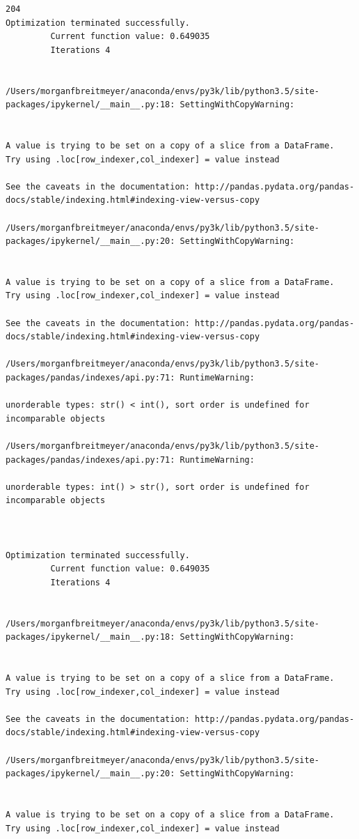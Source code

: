 \begin{lstlisting}
204
Optimization terminated successfully.
         Current function value: 0.649035
         Iterations 4


/Users/morganfbreitmeyer/anaconda/envs/py3k/lib/python3.5/site-packages/ipykernel/__main__.py:18: SettingWithCopyWarning:


A value is trying to be set on a copy of a slice from a DataFrame.
Try using .loc[row_indexer,col_indexer] = value instead

See the caveats in the documentation: http://pandas.pydata.org/pandas-docs/stable/indexing.html#indexing-view-versus-copy

/Users/morganfbreitmeyer/anaconda/envs/py3k/lib/python3.5/site-packages/ipykernel/__main__.py:20: SettingWithCopyWarning:


A value is trying to be set on a copy of a slice from a DataFrame.
Try using .loc[row_indexer,col_indexer] = value instead

See the caveats in the documentation: http://pandas.pydata.org/pandas-docs/stable/indexing.html#indexing-view-versus-copy

/Users/morganfbreitmeyer/anaconda/envs/py3k/lib/python3.5/site-packages/pandas/indexes/api.py:71: RuntimeWarning:

unorderable types: str() < int(), sort order is undefined for incomparable objects

/Users/morganfbreitmeyer/anaconda/envs/py3k/lib/python3.5/site-packages/pandas/indexes/api.py:71: RuntimeWarning:

unorderable types: int() > str(), sort order is undefined for incomparable objects



Optimization terminated successfully.
         Current function value: 0.649035
         Iterations 4


/Users/morganfbreitmeyer/anaconda/envs/py3k/lib/python3.5/site-packages/ipykernel/__main__.py:18: SettingWithCopyWarning:


A value is trying to be set on a copy of a slice from a DataFrame.
Try using .loc[row_indexer,col_indexer] = value instead

See the caveats in the documentation: http://pandas.pydata.org/pandas-docs/stable/indexing.html#indexing-view-versus-copy

/Users/morganfbreitmeyer/anaconda/envs/py3k/lib/python3.5/site-packages/ipykernel/__main__.py:20: SettingWithCopyWarning:


A value is trying to be set on a copy of a slice from a DataFrame.
Try using .loc[row_indexer,col_indexer] = value instead


\end{lstlisting}
